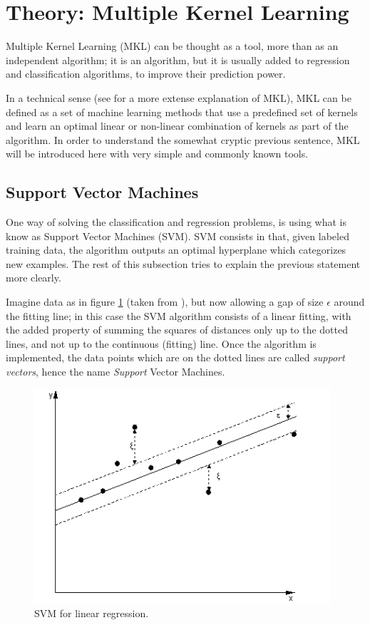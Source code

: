 \documentclass[paper=a4, fontsize=11pt]{scrartcl} %
\numberwithin{equation}{section} %
\numberwithin{figure}{section} %
\numberwithin{table}{section} %
\begin{document}
\section{Theory: Multiple Kernel Learning}

Multiple Kernel Learning (MKL) can be thought as a tool, more than as an independent algorithm; it is an algorithm, but it is usually added to regression and classification algorithms, to improve their prediction power.

In a technical sense (see \cite{mehmet} for a more extense explanation of MKL), MKL can be defined as a set of machine learning methods that use a predefined set of kernels and learn an optimal linear or non-linear combination of kernels as part of the algorithm. In order to understand the somewhat cryptic previous sentence, MKL will be introduced here with very simple and commonly known tools.

\subsection{Support Vector Machines}

One way of solving the classification and regression problems, is using what is know as Support Vector Machines (SVM). SVM consists in that, given labeled training data, the algorithm outputs an optimal hyperplane which categorizes new examples. The rest of this subsection tries to explain the previous statement more clearly.

Imagine data as in figure \ref{fig:SVM_example1} (taken from \cite{svm_linear}), but now allowing a gap of size $\epsilon$ around the fitting line; in this case the SVM algorithm consists of a linear fitting, with the added property of summing the squares of distances only up to the dotted lines, and not up to the continuous (fitting) line. Once the algorithm is implemented, the data points which are on the dotted lines are called \textit{support vectors}, hence the name \textit{Support} Vector Machines.

\begin{figure}[t]
\includegraphics[width=11cm]{svm_exmpl}
\centering
\caption{SVM for linear regression.}
\label{fig:SVM_example1}
\end{figure}
\end{document}
